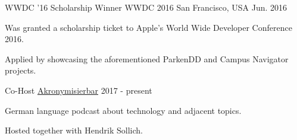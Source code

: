 
\begin{cventries}
	\cventry
		{WWDC '16 Scholarship Winner}
		{WWDC 2016}
		{San Francisco, USA}
		{Jun. 2016}
		{
			\begin{cvitems}
				\item {Was granted a scholarship ticket to Apple's World Wide Developer Conference 2016.}
				\item {Applied by showcasing the aforementioned ParkenDD and Campus Navigator projects.}
			\end{cvitems}
		}
		
	\cventry
		{Co-Host}
		{\href{http://www.akronymisier.bar}{Akronymisierbar}}
		{}
		{2017 - present}
		{
			\begin{cvitems}
				\item {German language podcast about technology and adjacent topics.}
				\item {Hosted together with Hendrik Sollich.}
			\end{cvitems}
		}
\end{cventries}